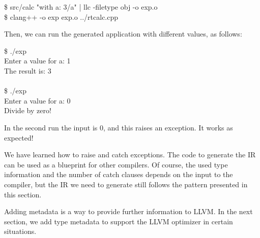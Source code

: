 \begin{tcolorbox}[colback=white,colframe=black]
\$ src/calc "with a: 3/a" | llc -filetype obj -o exp.o \\
\$ clang++ -o exp exp.o ../rtcalc.cpp
\end{tcolorbox}

Then, we can run the generated application with different values, as follows:\par

\begin{tcolorbox}[colback=white,colframe=black]
\$ ./exp \\
Enter a value for a: 1 \\
The result is: 3\\
\\
\$ ./exp \\
Enter a value for a: 0 \\
Divide by zero!
\end{tcolorbox}

In the second run the input is 0, and this raises an exception. It works as expected!\par

We have learned how to raise and catch exceptions. The code to generate the IR can be used as a blueprint for other compilers. Of course, the used type information and the number of catch clauses depends on the input to the compiler, but the IR we need to generate still follows the pattern presented in this section.\par

Adding metadata is a way to provide further information to LLVM. In the next section, we add type metadata to support the LLVM optimizer in certain situations.\par










